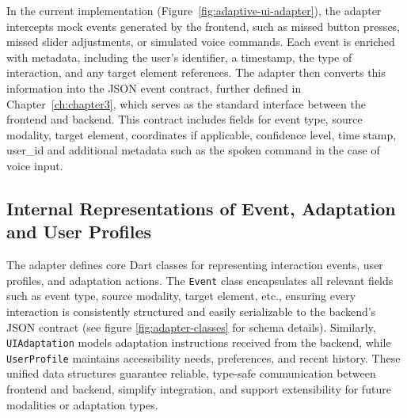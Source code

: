 In the current implementation (Figure~\ref{fig:adaptive-ui-adapter}), the adapter intercepts mock events generated by the frontend, such as missed button presses, missed slider adjustments, or simulated voice commands. Each event is enriched with metadata, including the user’s identifier, a timestamp, the type of interaction, and any target element references. The adapter then converts this information into the JSON event contract, further defined in Chapter~\ref{ch:chapter3}, which serves as the standard interface between the frontend and backend. This contract includes fields for event type, source modality, target element, coordinates if applicable, confidence level, time stamp, user\_id and additional metadata such as the spoken command in the case of voice input.

\subsection{Internal Representations of Event, Adaptation and User Profiles}
The adapter defines core Dart classes for representing interaction events, user profiles, and adaptation actions. The \texttt{Event} class encapsulates all relevant fields such as event type, source modality, target element, etc., ensuring every interaction is consistently structured and easily serializable to the backend’s JSON contract (see figure \ref{fig:adapter-classes} for schema details). Similarly, \texttt{UIAdaptation} models adaptation instructions received from the backend, while \texttt{UserProfile} maintains accessibility needs, preferences, and recent history. These unified data structures guarantee reliable, type-safe communication between frontend and backend, simplify integration, and support extensibility for future modalities or adaptation types.

